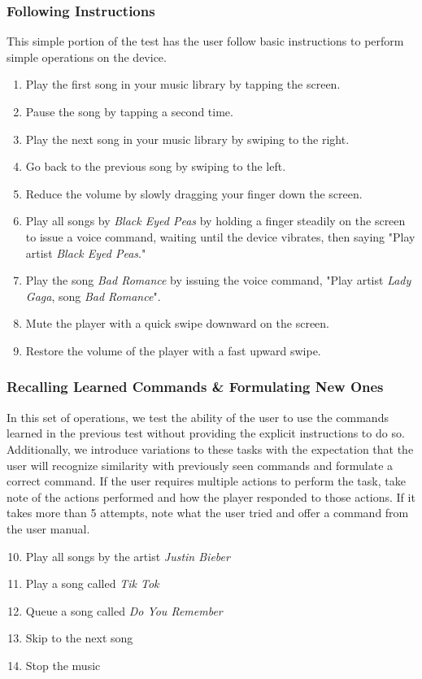 \documentclass[12pt,letterpaper]{article}
\begin{document}
\subsubsection{Following Instructions}
This simple portion of the test has the user follow basic instructions to perform simple operations on the device. \begin{enumerate}
\item Play the first song in your music library by tapping the screen.
\item Pause the song by tapping a second time.
\item Play the next song in your music library by swiping to the right.
\item Go back to the previous song by swiping to the left.
\item Reduce the volume by slowly dragging your finger down the screen.
\item Play all songs by \textit{Black Eyed Peas} by holding a finger steadily on the screen to issue a voice command, waiting until the device vibrates, then saying "Play artist \textit{Black Eyed Peas}."
\item Play the song \textit{Bad Romance} by issuing the voice command, "Play artist \textit{Lady Gaga}, song \textit{Bad Romance}".
\item Mute the player with a quick swipe downward on the screen.
\item Restore the volume of the player with a fast upward swipe.
\end{enumerate}

\subsubsection{Recalling Learned Commands \& Formulating New Ones}
In this set of operations, we test the ability of the user to use the commands learned in the previous test without providing the explicit instructions to do so. Additionally, we introduce variations to these tasks with the expectation that the user will recognize similarity with previously seen commands and formulate a correct command. If the user requires multiple actions to perform the task, take note of the actions performed and how the player responded to those actions. If it takes more than 5 attempts, note what the user tried and offer a command from the user manual.
\begin{enumerate}
\setcounter{enumi}{9}
\item Play all songs by the artist \textit{Justin Bieber}
\item Play a song called \textit{Tik Tok}
\item Queue a song called \textit{Do You Remember}
\item Skip to the next song
\item Stop the music
\end{enumerate}
\end{document}
